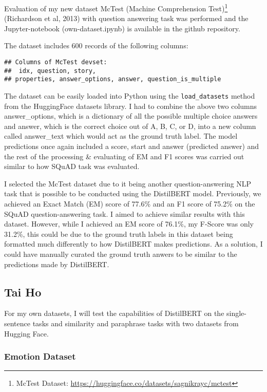\documentclass[
  11pt,
]{article}
\begin{document}
Evaluation of my new dataset McTest (Machine Comprehension
Test)\footnote{McTest Dataset:
  \url{https://huggingface.co/datasets/sagnikrayc/mctest}} (Richardson
et al, 2013) with question answering task was performed and the
Jupyter-notebook (own-dataset.ipynb) is available in the github
repository.

The dataset includes 600 records of the following columns:

\begin{verbatim}
## Columns of McTest devset:
##  idx, question, story,
## properties, answer_options, answer, question_is_multiple
\end{verbatim}

The dataset can be easily loaded into Python using the
\texttt{load\_datasets} method from the HuggingFace datasets library. I
had to combine the above two columns answer\_options, which is a
dictionary of all the possible multiple choice answers and answer, which
is the correct choice out of A, B, C, or D, into a new column called
answer\_text which would act as the ground truth label. The model
predictions once again included a score, start and answer (predicted
answer) and the rest of the processing \& evaluating of EM and F1 scores
was carried out similar to how SQuAD task was evaluated.

I selected the McTest dataset due to it being another question-answering
NLP task that is possible to be conducted using the DistilBERT model.
Previously, we achieved an Exact Match (EM) score of 77.6\% and an F1
score of 75.2\% on the SQuAD question-answering task. I aimed to achieve
similar results with this dataset. However, while I achieved an EM score
of 76.1\%, my F-Score was only 31.2\%, this could be due to the ground
truth labels in this dataset being formatted much differently to how
DistilBERT makes predictions. As a solution, I could have manually
curated the ground truth anwers to be similar to the predictions made by
DistilBERT.

\hypertarget{tai-ho}{%
\subsection{Tai Ho}\label{tai-ho}}

For my own datasets, I will test the capabilities of DistilBERT on the
single-sentence tasks and similarity and paraphrase tasks with two
datasets from Hugging Face.

\hypertarget{emotion-dataset}{%
\subsubsection{Emotion Dataset}\label{emotion-dataset}}
\end{document}
